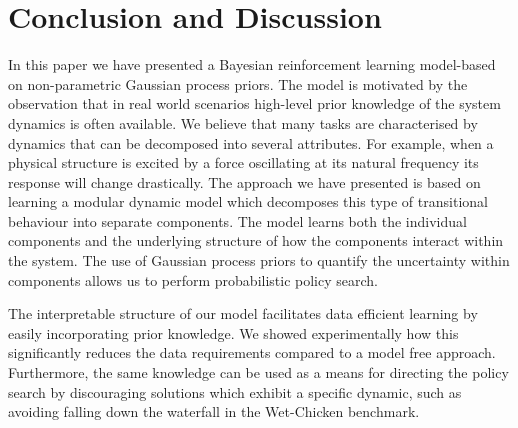 \section{Conclusion and Discussion}
\label{toc:interpretable_rl:conclusion}
In this paper we have presented a Bayesian reinforcement learning model-based on non-parametric Gaussian process priors.
The model is motivated by the observation that in real world scenarios high-level prior knowledge of the system dynamics is often available.
We believe that many tasks are characterised by dynamics that can be decomposed into several attributes.
For example, when a physical structure is excited by a force oscillating at its natural frequency its response will change drastically.
The approach we have presented is based on learning a modular dynamic model which decomposes this type of transitional behaviour into separate components.
The model learns both the individual components and the underlying structure of how the components interact within the system.
The use of Gaussian process priors to quantify the uncertainty within components allows us to perform probabilistic policy search.

The interpretable structure of our model facilitates data efficient learning by easily incorporating prior knowledge.
We showed experimentally how this significantly reduces the data requirements compared to a model free approach.
Furthermore, the same knowledge can be used as a means for directing the policy search by discouraging solutions which exhibit a specific dynamic, such as avoiding falling down the waterfall in the Wet-Chicken benchmark.


